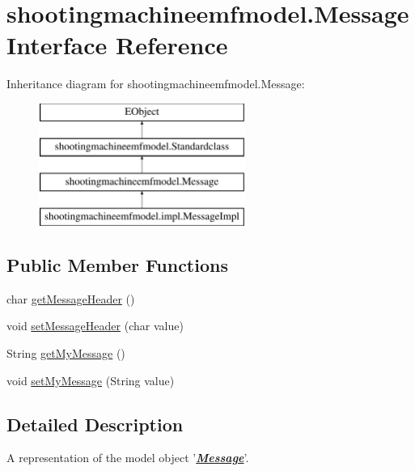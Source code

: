 \hypertarget{interfaceshootingmachineemfmodel_1_1_message}{\section{shootingmachineemfmodel.\-Message Interface Reference}
\label{interfaceshootingmachineemfmodel_1_1_message}
}
Inheritance diagram for shootingmachineemfmodel.\-Message\-:\begin{figure}[H]
\begin{center}
\leavevmode
\includegraphics[height=4.000000cm]{interfaceshootingmachineemfmodel_1_1_message}
\end{center}
\end{figure}
\subsection*{Public Member Functions}
\begin{DoxyCompactItemize}
\item 
char \hyperlink{interfaceshootingmachineemfmodel_1_1_message_ab0dca65cf03c9f82b6cead435799ae6e}{get\-Message\-Header} ()
\item 
void \hyperlink{interfaceshootingmachineemfmodel_1_1_message_a02ca93f821572abe98a1be71bda62d46}{set\-Message\-Header} (char value)
\item 
String \hyperlink{interfaceshootingmachineemfmodel_1_1_message_a23c054019176f7a67e38766d19d4d1d2}{get\-My\-Message} ()
\item 
void \hyperlink{interfaceshootingmachineemfmodel_1_1_message_a6936e4305001066daa1e5528a761114f}{set\-My\-Message} (String value)
\end{DoxyCompactItemize}


\subsection{Detailed Description}
A representation of the model object '{\itshape {\bfseries \hyperlink{interfaceshootingmachineemfmodel_1_1_message}{Message}}}'.

